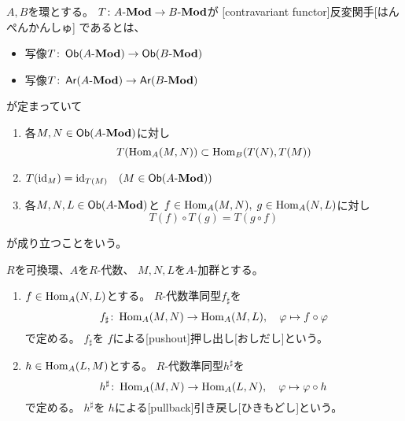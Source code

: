\documentclass[report]{jlreq}
\begin{document}
\begin{definition}[反変関手]
    $A, B$を環とする。
    $T \colon A\text{-}\mathbf{Mod} \to B\text{-}\mathbf{Mod}$が
    [contravariant functor]{反変関手}[はんぺんかんしゅ]
    であるとは、
    \begin{itemize}
        \item 写像$T \colon \operatorname{\mathsf{Ob}}(A\text{-}\mathbf{Mod}) \to \operatorname{\mathsf{Ob}}(B\text{-}\mathbf{Mod})$
        \item 写像$T \colon \operatorname{\mathsf{Ar}}(A\text{-}\mathbf{Mod}) \to \operatorname{\mathsf{Ar}}(B\text{-}\mathbf{Mod})$
    \end{itemize}
    が定まっていて
    \begin{enumerate}
        \item 各$M, N \in \operatorname{\mathsf{Ob}}(A\text{-}\mathbf{Mod})$に対し
            \begin{equation}
                T(\operatorname{Hom}_A(M, N)) \subset \operatorname{Hom}_B(T(N), T(M))
            \end{equation}
        \item $T(\mathrm{id}_M) = \mathrm{id}_{T(M)} \quad (M \in \operatorname{\mathsf{Ob}}(A\text{-}\mathbf{Mod}))$
        \item 各$M, N, L \in \operatorname{\mathsf{Ob}}(A\text{-}\mathbf{Mod})$と
            $f \in \operatorname{Hom}_A(M, N), \; g \in \operatorname{Hom}_A(N, L)$に対し
            \begin{equation}
                T(f) \circ T(g) = T(g \circ f)
            \end{equation}
    \end{enumerate}
    が成り立つことをいう。
\end{definition}

\begin{definition}[押し出しと引き戻し]
    $R$を可換環、$A$を$R$-代数、
    $M, N, L$を$A$-加群とする。
    \begin{enumerate}
        \item $f \in \operatorname{Hom}_A(N, L)$とする。
            $R$-代数準同型$f_\sharp$を
            \begin{equation}
                f_\sharp \colon \operatorname{Hom}_A(M, N) \to \operatorname{Hom}_A(M, L),
                \quad
                \varphi \mapsto f \circ \varphi
            \end{equation}
            で定める。
            $f_\sharp$を
            $f$による[pushout]{押し出し}[おしだし]という。
        \item $h \in \operatorname{Hom}_A(L, M)$とする。
            $R$-代数準同型$h^\sharp$を
            \begin{equation}
                h^\sharp \colon \operatorname{Hom}_A(M, N) \to \operatorname{Hom}_A(L, N),
                \quad
                \varphi \mapsto \varphi \circ h
            \end{equation}
            で定める。
            $h^\sharp$を
            $h$による[pullback]{引き戻し}[ひきもどし]という。
    \end{enumerate}
\end{definition}
\end{document}

